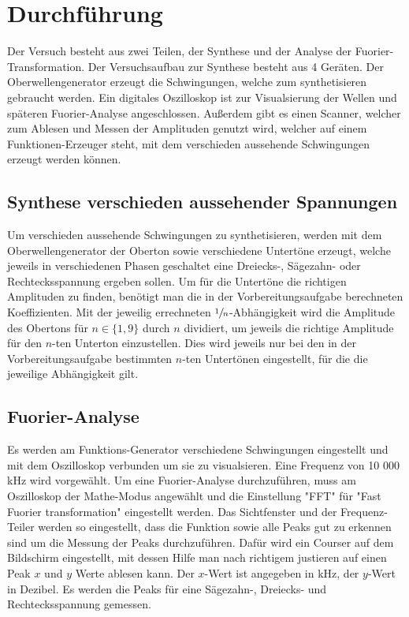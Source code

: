 \section{Durchführung}
\label{sec:Durchführung}
Der Versuch besteht aus zwei Teilen, der Synthese und der Analyse der Fuorier-Transformation.
Der Versuchsaufbau zur Synthese besteht aus 4 Geräten. Der Oberwellengenerator erzeugt die Schwingungen, welche zum 
synthetisieren gebraucht werden. Ein digitales Oszilloskop ist zur Visualsierung der Wellen und späteren Fuorier-Analyse angeschlossen.
Außerdem gibt es einen Scanner, welcher zum Ablesen und Messen der Amplituden genutzt wird, welcher auf einem Funktionen-Erzeuger steht,
mit dem verschieden aussehende Schwingungen erzeugt werden können.\\ 
\subsection{Synthese verschieden aussehender Spannungen}
Um verschieden aussehende Schwingungen zu synthetisieren, werden mit dem Oberwellengenerator der Oberton sowie verschiedene
Untertöne erzeugt, welche jeweils in verschiedenen Phasen geschaltet eine Dreiecks-, Sägezahn- oder Rechtecksspannung
ergeben sollen. Um für die Untertöne die richtigen Amplituden zu finden, benötigt man die in der Vorbereitungsaufgabe berechneten 
Koeffizienten. Mit der jeweilig errechneten $\sfrac{1}{n}$-Abhängigkeit wird die Amplitude des Obertons für $n\in\{1,9\}$ durch $n$ dividiert, um 
jeweils die richtige Amplitude für den $n$-ten Unterton einzustellen. Dies wird jeweils nur bei den in der Vorbereitungsaufgabe bestimmten $n$-ten 
Untertönen eingestellt, für die die jeweilige Abhängigkeit gilt.

\subsection{Fuorier-Analyse}
Es werden am Funktions-Generator verschiedene Schwingungen eingestellt und mit dem Oszilloskop verbunden um sie zu 
visualsieren. Eine Frequenz von 10 000\,kHz wird vorgewählt. Um eine Fuorier-Analyse durchzuführen, muss am Oszilloskop
der Mathe-Modus angewählt und die Einstellung "FFT" für "Fast Fuorier transformation" eingestellt werden. Das Sichtfenster 
und der Frequenz-Teiler werden so eingestellt, dass die Funktion sowie alle Peaks gut zu erkennen sind um die Messung der Peaks
durchzuführen. Dafür wird ein Courser auf dem Bildschirm eingestellt, mit dessen Hilfe man nach richtigem justieren auf einen Peak
$x$ und $y$ Werte ablesen kann. Der $x$-Wert ist angegeben in kHz, der $y$-Wert in Dezibel. Es werden die Peaks für eine Sägezahn-,
Dreiecks- und Rechtecksspannung gemessen.  